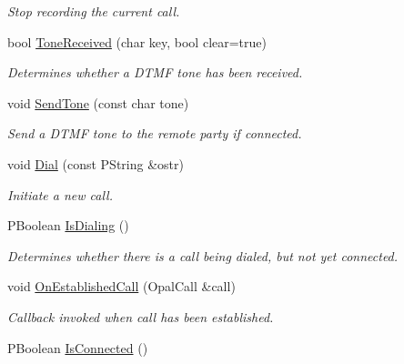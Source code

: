 \begin{CompactItemize}
\begin{CompactList}\small\item\em Stop recording the current call. \item\end{CompactList}\item 
bool \hyperlink{classTelephonyIfc_60cba0b92e2f33357c063c251fae2997}{ToneReceived} (char key, bool clear=true)
\begin{CompactList}\small\item\em Determines whether a DTMF tone has been received. \item\end{CompactList}\item 
void \hyperlink{classTelephonyIfc_ac6179d75a2c623e05ccb345b45741f1}{SendTone} (const char tone)
\begin{CompactList}\small\item\em Send a DTMF tone to the remote party if connected. \item\end{CompactList}\item 
void \hyperlink{classTelephonyIfc_2e0adbafa63cd9c07a1c1c6ce68bf933}{Dial} (const PString \&ostr)
\begin{CompactList}\small\item\em Initiate a new call. \item\end{CompactList}\item 
\hypertarget{classTelephonyIfc_074e1d67c95ce1e66d346bb7315d5dcd}{
PBoolean \hyperlink{classTelephonyIfc_074e1d67c95ce1e66d346bb7315d5dcd}{IsDialing} ()}
\label{classTelephonyIfc_074e1d67c95ce1e66d346bb7315d5dcd}

\begin{CompactList}\small\item\em Determines whether there is a call being dialed, but not yet connected. \item\end{CompactList}\item 
void \hyperlink{classTelephonyIfc_a482ebd5daf3bf5d69ec40a46a0616e9}{OnEstablishedCall} (OpalCall \&call)
\begin{CompactList}\small\item\em Callback invoked when call has been established. \item\end{CompactList}\item 
\hypertarget{classTelephonyIfc_2a68749063e9e0c45ac31e8e44fa0849}{
PBoolean \hyperlink{classTelephonyIfc_2a68749063e9e0c45ac31e8e44fa0849}{IsConnected} ()}
\label{classTelephonyIfc_2a68749063e9e0c45ac31e8e44fa0849}


\end{CompactItemize}
